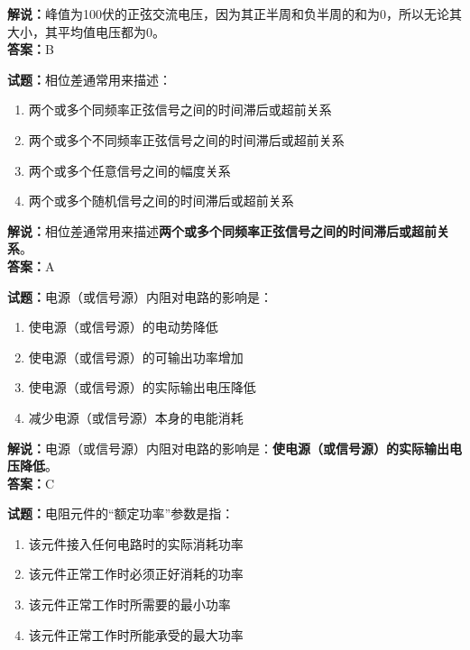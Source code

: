 \documentclass{ctexbook}
\begin{document}
\noindent\textbf{解说：}峰值为\num{100}伏的正弦交流电压，因为其正半周和负半周的和为\num{0}，所以无论其大小，其平均值电压都为\num{0}。\\
\noindent\textbf{答案：}B


\bigskip


\noindent\textbf{试题：}相位差通常用来描述：

\begin{enumerate}[leftmargin=3em]
	\item 两个或多个同频率正弦信号之间的时间滞后或超前关系
	\item 两个或多个不同频率正弦信号之间的时间滞后或超前关系
	\item 两个或多个任意信号之间的幅度关系
	\item 两个或多个随机信号之间的时间滞后或超前关系
\end{enumerate}

\noindent\textbf{解说：}相位差通常用来描述\textbf{两个或多个同频率正弦信号之间的时间滞后或超前关系}。\\\noindent\textbf{答案：}A


\bigskip


\noindent\textbf{试题：}电源（或信号源）内阻对电路的影响是：

\begin{enumerate}[leftmargin=3em]
	\item 使电源（或信号源）的电动势降低
	\item 使电源（或信号源）的可输出功率增加
	\item 使电源（或信号源）的实际输出电压降低
	\item 减少电源（或信号源）本身的电能消耗
\end{enumerate}

\noindent\textbf{解说：}电源（或信号源）内阻对电路的影响是：\textbf{使电源（或信号源）的实际输出电压降低}。\\\noindent\textbf{答案：}C


\bigskip


\noindent\textbf{试题：}电阻元件的“额定功率”参数是指：

\begin{enumerate}[leftmargin=3em]
	\item 该元件接入任何电路时的实际消耗功率
	\item 该元件正常工作时必须正好消耗的功率
	\item 该元件正常工作时所需要的最小功率
	\item 该元件正常工作时所能承受的最大功率
\end{enumerate}
\end{document}
